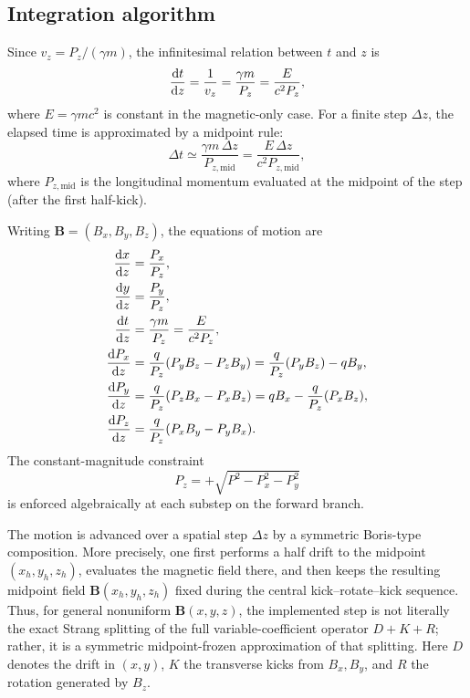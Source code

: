\subsection{Integration algorithm}
\label{boris:sec:algorithm}

Since \(v_z = P_z/(\gamma m)\), the infinitesimal relation between \(t\) and
\(z\) is
\begin{equation}
\frac{\text{d} {t}}{\text{d} {z}} = \frac{1}{v_z} = \frac{\gamma m}{P_z}
= \frac{E}{c^2 P_z},
\label{boris:eq:dt_dz}
\end{equation}
where \(E=\gamma m c^2\) is constant in the magnetic-only case.
For a finite step \(\Delta z\), the elapsed time is approximated by a midpoint
rule:
\begin{equation}
\Delta t \simeq \frac{\gamma m\,\Delta z}{P_{z,\mathrm{mid}}}
= \frac{E\,\Delta z}{c^2 P_{z,\mathrm{mid}}},
\label{boris:eq:dt}
\end{equation}
where \(P_{z,\mathrm{mid}}\) is the longitudinal momentum evaluated at the
midpoint of the step (after the first half-kick).

Writing \(\bm{B}=(B_x,B_y,B_z)\), the equations of motion are
\begin{align}
\frac{\text{d} {x}}{\text{d} {z}} & = \frac{P_x}{P_z},\\
\frac{\text{d} {y}}{\text{d} {z}} & = \frac{P_y}{P_z},\\
\frac{\text{d} {t}}{\text{d} {z}} & = \frac{\gamma m}{P_z} = \frac{E}{c^2 P_z},\\
\frac{\text{d} {P_x}}{\text{d} {z}} &= \frac{q}{P_z}(P_y B_z - P_z B_y)
           = \frac{q}{P_z}(P_y B_z) - q B_y,\\
\frac{\text{d} {P_y}}{\text{d} {z}} &= \frac{q}{P_z}(P_z B_x - P_x B_z)
           = q B_x - \frac{q}{P_z}(P_x B_z),\\
\frac{\text{d} {P_z}}{\text{d} {z}} &= \frac{q}{P_z}(P_x B_y - P_y B_x).
\end{align}
The constant-magnitude constraint
\[
P_z = +\sqrt{P^2 - P_x^2 - P_y^2}
\]
is enforced algebraically at each substep on the forward branch.

The motion is advanced over a spatial step \(\Delta z\) by a symmetric
Boris-type composition.
More precisely, one first performs a half drift to the midpoint
\((x_h,y_h,z_h)\), evaluates the magnetic field there, and then keeps the
resulting midpoint field \(\bm B(x_h,y_h,z_h)\) fixed during the central
kick--rotate--kick sequence.
Thus, for general nonuniform \(\bm B(x,y,z)\), the implemented step is not
literally the exact Strang splitting of the full variable-coefficient operator
\(D+K+R\); rather, it is a symmetric midpoint-frozen approximation of that
splitting.
Here \(D\) denotes the drift in \((x,y)\), \(K\) the transverse kicks from
\(B_x,B_y\), and \(R\) the rotation generated by \(B_z\).

